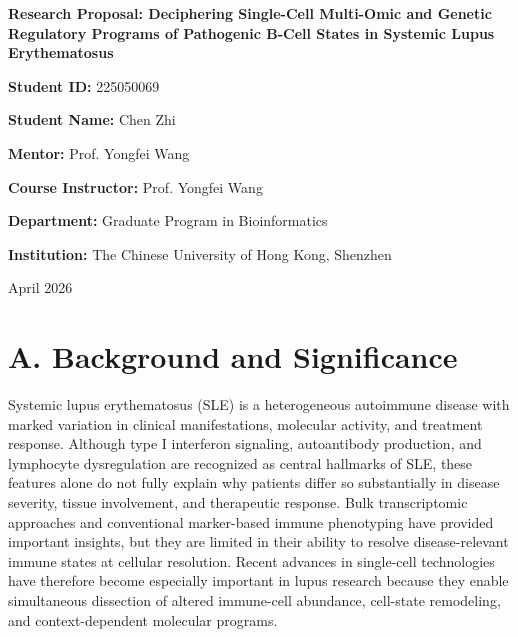 \documentclass[12pt, a4paper]{article}
\begin{document}
\begin{titlepage}
    \centering
    \vspace*{2cm}

    {\LARGE \bfseries Research Proposal: Deciphering Single-Cell Multi-Omic and Genetic Regulatory Programs of Pathogenic B-Cell States in Systemic Lupus Erythematosus\par}
    
    \vspace{2.5cm}
    
    {\Large \textbf{Student ID:} 225050069\par}
    \vspace{0.5cm}
    {\Large \textbf{Student Name:} Chen Zhi\par}
    \vspace{0.5cm}
    {\Large \textbf{Mentor:} Prof. Yongfei Wang\par}
    \vspace{0.5cm}
    {\Large \textbf{Course Instructor:} Prof. Yongfei Wang\par}
    \vspace{0.5cm}
    {\Large \textbf{Department:} Graduate Program in Bioinformatics\par}
    \vspace{0.5cm}
    {\Large \textbf{Institution:} The Chinese University of Hong Kong, Shenzhen\par}
    
    \vfill
    
    {\large April 2026\par}
\end{titlepage}

\newpage

\section*{A. Background and Significance}

Systemic lupus erythematosus (SLE) is a heterogeneous autoimmune disease with marked variation in clinical manifestations, molecular activity, and treatment response. Although type I interferon signaling, autoantibody production, and lymphocyte dysregulation are recognized as central hallmarks of SLE, these features alone do not fully explain why patients differ so substantially in disease severity, tissue involvement, and therapeutic response. Bulk transcriptomic approaches and conventional marker-based immune phenotyping have provided important insights, but they are limited in their ability to resolve disease-relevant immune states at cellular resolution. Recent advances in single-cell technologies have therefore become especially important in lupus research because they enable simultaneous dissection of altered immune-cell abundance, cell-state remodeling, and context-dependent molecular programs.
\end{document}
